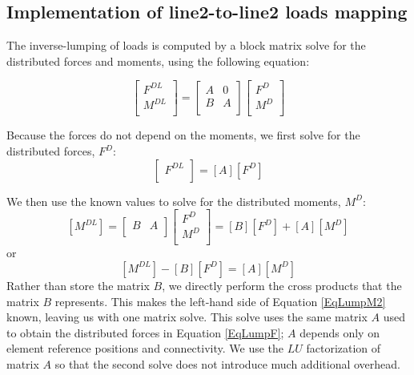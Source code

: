 \documentclass[10pt,letterpaper,oneside,notitlepage]{article}
\begin{document}
\subsection {Implementation of line2-to-line2 loads mapping}
The inverse-lumping of loads is computed by a block matrix solve for the distributed forces and moments, 
using the following equation:

\begin{equation}
\label{EqLump}
   \begin{bmatrix}
   F^{DL} \\
   M^{DL} \\
   \end{bmatrix}
=
   \begin{bmatrix}
      A & 0 \\
      B & A \\   
   \end{bmatrix}
   \begin{bmatrix}
   F^{D} \\
   M^{D} \\
   \end{bmatrix}
\end{equation}

Because the forces do not depend on the moments, we first solve for the distributed forces, $F^D$:
\begin{equation}
\label{EqLumpF}
   \begin{bmatrix}   F^{DL} \\   \end{bmatrix}
=
   \left[      A    \right]
   \left[   F^{D}  \right]
\end{equation}

We then use the known values to solve for the distributed moments, $M^D$:
\begin{equation}
\label{EqLumpM1}
   \left[   M^{DL} \right]
=
   \begin{bmatrix} B & A \\   \end{bmatrix}
   \begin{bmatrix}
   F^{D} \\
   M^{D} \\
   \end{bmatrix}
= \left[   B \right] \left[   F^D \right] + \left[   A \right] \left[   M^D \right] 
\end{equation}
or
\begin{equation}
\label{EqLumpM2}
\left[   M^{DL} \right] - \left[   B \right] \left[   F^D \right] = \left[   A \right] \left[   M^D \right]
\end{equation}
Rather than store the matrix $B$, we directly perform the cross products that the matrix $B$ represents.
This makes the left-hand side of Equation \ref{EqLumpM2} known, leaving us with one matrix solve. This 
solve uses the same matrix $A$ used to obtain the distributed forces in Equation \ref{EqLumpF}; $A$ depends 
only on element reference positions and connectivity. We use 
the $LU$ factorization of matrix $A$ so that the second solve does not introduce much additional overhead.
\end{document}
